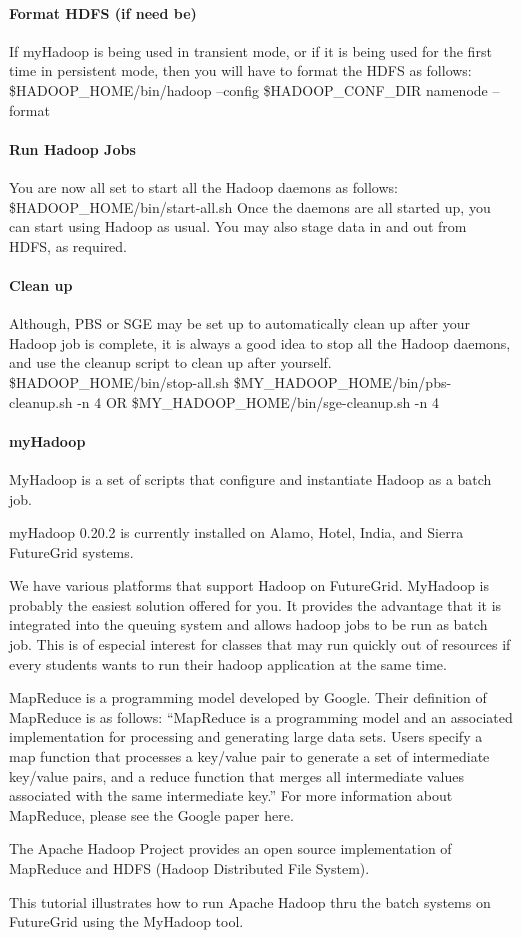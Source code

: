 \paragraph{Format HDFS (if need be)}

If myHadoop is being used in transient mode, or if it is being used for the first time in
persistent mode, then you will have to format the HDFS as follows:
\$HADOOP\_HOME/bin/hadoop --config \$HADOOP\_CONF\_DIR namenode –format

\paragraph{Run Hadoop Jobs}

You are now all set to start all the Hadoop daemons as follows:
\$HADOOP\_HOME/bin/start-all.sh
Once the daemons are all started up, you can start using Hadoop as usual. You may also
stage data in and out from HDFS, as required.

\paragraph{Clean up}

Although, PBS or SGE may be set up to automatically clean up after your Hadoop job is
complete, it is always a good idea to stop all the Hadoop daemons, and use the cleanup
script to clean up after yourself.
\$HADOOP\_HOME/bin/stop-all.sh
\$MY\_HADOOP\_HOME/bin/pbs-cleanup.sh -n 4 OR
\$MY\_HADOOP\_HOME/bin/sge-cleanup.sh -n 4


\paragraph{myHadoop}

MyHadoop is a set of scripts that configure and instantiate Hadoop as a batch job.

myHadoop 0.20.2 is currently installed on Alamo, Hotel, India, and Sierra FutureGrid systems.



We have various platforms that support Hadoop on FutureGrid. MyHadoop is probably the easiest solution offered for you. It provides the advantage that it is integrated into the queuing system and allows hadoop jobs to be run as batch job. This is of especial interest for classes that may run quickly out of resources if every students wants to run their hadoop application at the same time.



MapReduce is a programming model developed by Google. Their definition of MapReduce is as follows: “MapReduce is a programming model and an associated implementation for processing and generating large data sets. Users specify a map function that processes a key/value pair to generate a set of intermediate key/value pairs, and a reduce function that merges all intermediate values associated with the same intermediate key.” For more information about MapReduce, please see the Google paper here.

The Apache Hadoop Project provides an open source implementation of MapReduce and HDFS (Hadoop Distributed File System).

This tutorial illustrates how to run Apache Hadoop thru the batch systems on FutureGrid using the MyHadoop tool.



